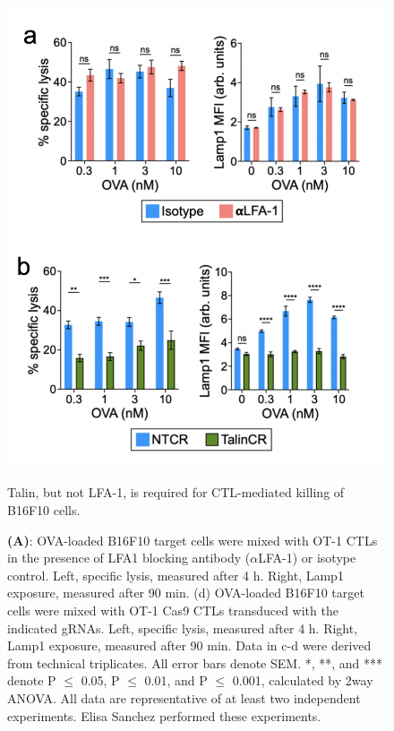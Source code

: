 \begin{figure}[htbp]
	\centering
	\includegraphics[width=1.0\columnwidth]{../figures/chapter3/fig5assays.png}
	\caption{Talin, but not LFA-1, is required for CTL-mediated killing of B16F10 cells.}
	\caption*{\textbf{(A)}: OVA-loaded B16F10 target cells were mixed with OT-1 CTLs in the presence of LFA1 blocking antibody ($\alpha$LFA-1) or isotype control. Left, specific lysis, measured after 4 h. Right, Lamp1 exposure, measured after 90 min. (d) OVA-loaded B16F10 target cells were mixed with OT-1 Cas9 CTLs transduced with the indicated gRNAs. Left, specific lysis, measured after 4 h. Right, Lamp1 exposure, measured after 90 min. Data in c-d were derived from technical triplicates. All error bars denote SEM. *, **, and *** denote P $\leq$ 0.05, P $\leq$ 0.01, and P $\leq$ 0.001, calculated by 2way ANOVA. All data are representative of at least two independent experiments. Elisa Sanchez performed these experiments.}
	\label{fig:fig5assays}
\end{figure} 

